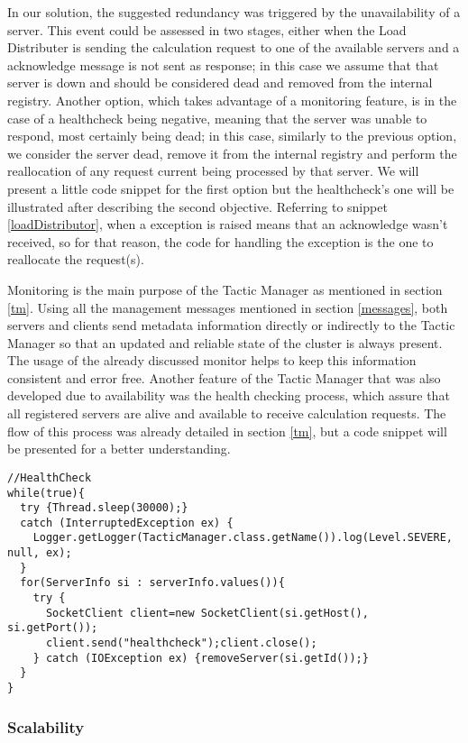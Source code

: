 \documentclass[12pt]{article}
\begin{document}
In our solution, the suggested redundancy was triggered by the unavailability of a server. This event could be assessed in two stages, either when the Load Distributer is sending the calculation request to one of the available servers and a acknowledge message is not sent as response; in this case we assume that that server is down and should be considered dead and removed from the internal registry. Another option, which takes advantage of a monitoring feature, is in the case of a healthcheck being negative, meaning that the server was unable to respond, most certainly being dead; in this case, similarly to the previous option, we consider the server dead, remove it from the internal registry and perform the reallocation of any request current being processed by that server. We will present a little code snippet for the first option but the healthcheck's one will be illustrated after describing the second objective. Referring to snippet \ref{loadDistributor}, when a exception is raised means that an acknowledge wasn't received, so for that reason, the code for handling the exception is the one to reallocate the request(s).

Monitoring is the main purpose of the Tactic Manager as mentioned in section \ref{tm}. Using all the management messages mentioned in section \ref{messages}, both servers and clients send metadata information directly or indirectly to the Tactic Manager so that an updated and reliable state of the cluster is always present. The usage of the already discussed monitor helps to keep this information consistent and error free. Another feature of the Tactic Manager that was also developed due to availability was the health checking process, which assure that all registered servers are alive and available to receive calculation requests. The flow of this process was already detailed in section \ref{tm}, but a code snippet will be presented for a better understanding.

\begin{lstlisting}
//HealthCheck
while(true){
  try {Thread.sleep(30000);}
  catch (InterruptedException ex) {
    Logger.getLogger(TacticManager.class.getName()).log(Level.SEVERE, null, ex);
  }
  for(ServerInfo si : serverInfo.values()){
    try {
      SocketClient client=new SocketClient(si.getHost(), si.getPort());
      client.send("healthcheck");client.close();
    } catch (IOException ex) {removeServer(si.getId());}
  }
}
\end{lstlisting}

\subsubsection{Scalability} \label{scalability}
\end{document}
